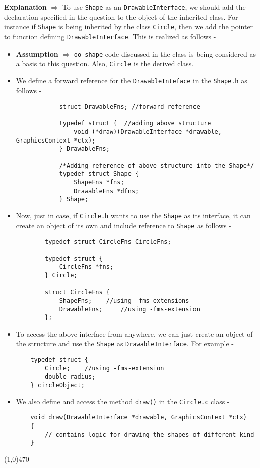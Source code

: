 \documentclass[12pt]{article}
\begin{document}
\textbf{Explanation} $\Rightarrow$ To use \texttt{Shape} as an \texttt{DrawableInterface}, we should add the declaration specified in the question to the object of the inherited class. For instance if \texttt{Shape} is being inherited by the class \texttt{Circle}, then we add the pointer to function defining \texttt{DrawableInterface}. This is realized as follows - 
\begin{itemize}
    \item \textbf{Assumption} $\Rightarrow$ \texttt{oo-shape} code discussed in the class is being considered as a basis to this question. Also, \texttt{Circle} is the derived class.
    \item We define a forward reference for the \texttt{DrawableInteface} in the \texttt{Shape.h} as follows - 
    		\begin{verbatim}
    		struct DrawableFns; //forward reference
    		
    		typedef struct {  //adding above structure
    		    void (*draw)(DrawableInterface *drawable, GraphicsContext *ctx);
    		} DrawableFns;
    		
    		/*Adding reference of above structure into the Shape*/
    		typedef struct Shape {
    		    ShapeFns *fns;
    		    DrawableFns *dfns;
    		} Shape;
    		\end{verbatim}
    	\item Now, just in case, if \texttt{Circle.h} wants to use the \texttt{Shape} as its interface, it can create an object of its own and include reference to \texttt{Shape} as follows - 
    	\begin{verbatim}
    	typedef struct CircleFns CircleFns;
    	
    	typedef struct {
    	    CircleFns *fns;
    	} Circle;
    	
    	struct CircleFns {
    	    ShapeFns;    //using -fms-extensions
    	    DrawableFns;     //using -fms-extension
    	};
	\end{verbatim}   
	\item To access the above interface from anywhere, we can just create an object of the structure and use the \texttt{Shape} as \texttt{DrawableInterface}. For example - 
	\begin{verbatim}
	typedef struct {
	    Circle;    //using -fms-extension
	    double radius;
	} circleObject;
	\end{verbatim}
	\item We also define and access the method \texttt{draw()} in the \texttt{Circle.c} class -  
	\begin{verbatim}
	void draw(DrawableInterface *drawable, GraphicsContext *ctx)
	{
	    // contains logic for drawing the shapes of different kind
	}
	\end{verbatim}
\end{itemize}  
\vspace{-5mm}
\begin{center}
\line(1,0){470}
\end{center}
\end{document}
